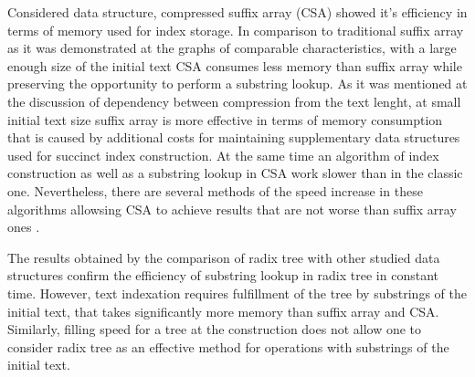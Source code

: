 
Considered data structure, compressed suffix array (CSA) showed it's efficiency
in terms of memory used for index storage. In comparison to traditional
suffix array as it was demonstrated at the graphs of comparable characteristics,
with a large enough size of the initial text CSA consumes less memory than suffix array
while preserving the opportunity to perform a substring lookup.
As it was mentioned at the discussion of dependency between compression from the text lenght,
at small initial text size suffix array is more effective in terms of memory consumption that
is caused by additional costs for maintaining supplementary data structures used for succinct index construction.
At the same time an algorithm of index construction as well as a substring lookup in CSA
work slower than in the classic one. Nevertheless, there are several methods of the
speed increase in these algorithms allowsing CSA to achieve results that are not worse
than suffix array ones \cite{andersensimple}.

The results obtained by the comparison of radix tree with other studied data structures
confirm the efficiency of substring lookup in radix tree in constant time.
However, text indexation requires fulfillment of the tree by substrings of the initial text,
that takes significantly more memory than suffix array and CSA.
Similarly, filling speed for a tree at the construction does not allow one to consider
radix tree as an effective method for operations with substrings of the initial text.
